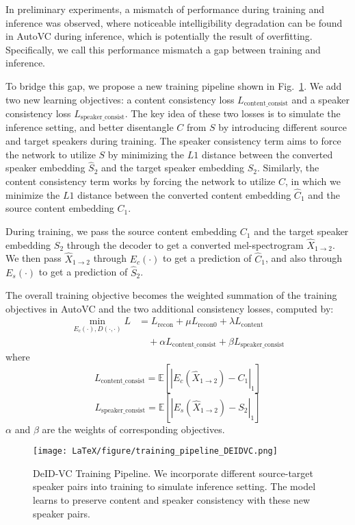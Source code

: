 \documentclass[a4paper]{article}
\begin{document}
    In preliminary experiments, a mismatch of performance during training and inference was observed, where noticeable intelligibility degradation can be found in AutoVC during inference, which is potentially the result of overfitting. Specifically, we call this performance mismatch a gap between training and inference.
    
    To bridge this gap, we propose a new training pipeline shown in Fig.~\ref{fig:proposed figure}. We add two new learning objectives: a content consistency loss $L_{\text{content\_consist}}$ and a speaker consistency loss $L_{\text{speaker\_consist}}$. The key idea of these two losses is to simulate the inference setting, and better disentangle $C$ from $S$ by introducing different source and target speakers during training. The speaker consistency term aims to force the network to utilize $S$ by minimizing the $L1$ distance between the converted speaker embedding $\hat{S}_2$ and the target speaker embedding $S_2$. Similarly, the content consistency term works by forcing the network to utilize $C$, in which we minimize the $L1$ distance between the converted content embedding $\hat{C}_1$ and the source content embedding $C_1$.
    
    During training, we pass the source content embedding $C_1$ and the target speaker embedding $S_2$ through the decoder to get a converted mel-spectrogram $\hat{X}_{1\rightarrow 2}$. We then pass $\hat{X}_{1\rightarrow 2}$ through $E_{c}(\cdot)$ to get a prediction of $\hat{C}_1$, and also through $E_{s}(\cdot)$ to get a prediction of $\hat{S}_2$. 
    
    The overall training objective becomes the weighted summation of the training objectives in AutoVC and the two additional consistency losses, computed by:
    \begin{align*}
        \min_{E_{c}(\cdot), D(\cdot,\cdot)} L & = L_{\text{recon}} + \mu L_{\text{recon0}} + \lambda L_{\text{content}} \\ & \quad + \alpha L_{\text{content\_consist}} + \beta L_{\text{speaker\_consist}}
    \end{align*}
    where
    \[L_{\text{content\_consist}} = \mathbb{E}\left[\left\lvert E_{c} (\hat{X}_{1\rightarrow 2}) - C_{1}\right\rvert_{1}\right]\]
    \[L_{\text{speaker\_consist}} = \mathbb{E}\left[\left\lvert E_{s} (\hat{X}_{1\rightarrow 2}) - S_{2}\right\rvert_{1}\right]\]
    $\alpha$ and $\beta$ are the weights of corresponding objectives.

    \begin{figure}[th]
        \centering
        \texttt{[image: LaTeX/figure/training\_pipeline\_DEIDVC.png]}
        \caption{DeID-VC Training Pipeline. We incorporate different source-target speaker pairs into training to simulate inference setting. The model learns to preserve content and speaker consistency with these new speaker pairs.}
        \label{fig:proposed figure}
    \end{figure}
    
\end{document}
